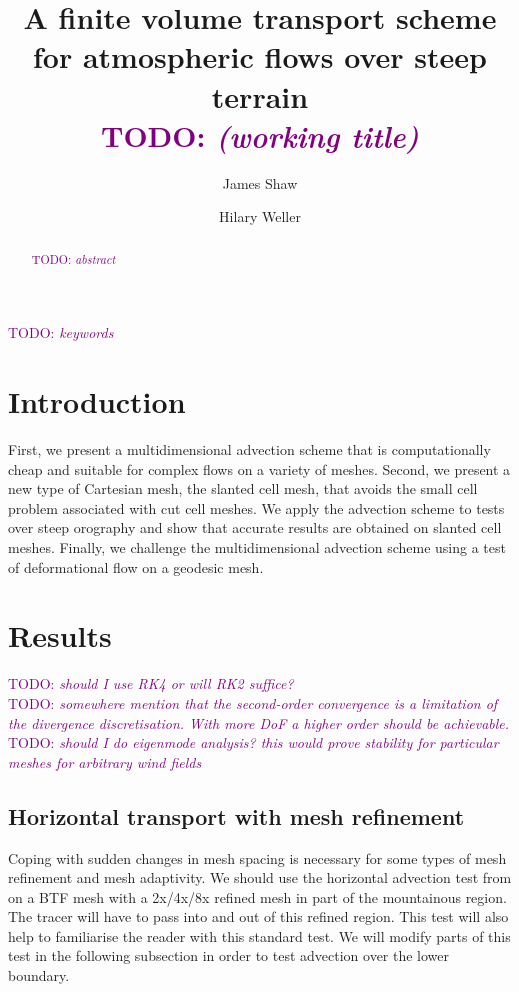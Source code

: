 \documentclass[times]{elsarticle}
\newcommand{\TODO}[1]{\textcolor{purple}{TODO: \emph{#1}}}
\begin{document}
\begin{frontmatter}
\title{A finite volume transport scheme for atmospheric flows over steep terrain \\ \TODO{(working title)}}
\author[uor]{James Shaw}
\author[uor]{Hilary Weller}

\address[uor]{Department of Meteorology, University of Reading, Reading, United Kingdom}

\begin{abstract}
	\TODO{abstract}
\end{abstract}

\begin{keyword}
	\TODO{keywords}
\end{keyword}
\end{frontmatter}

\section{Introduction}

First, we present a multidimensional advection scheme that is computationally cheap and suitable for complex flows on a variety of meshes.  Second, we present a new type of Cartesian mesh, the slanted cell mesh, that avoids the small cell problem associated with cut cell meshes.   We apply the advection scheme to tests over steep orography and show that accurate results are obtained on slanted cell meshes.  Finally, we challenge the multidimensional advection scheme using a test of deformational flow on a geodesic mesh.





\section{Results}
\TODO{should I use RK4 or will RK2 suffice?} \\
\TODO{somewhere mention that the second-order convergence is a limitation of the divergence discretisation.  With more DoF a higher order should be achievable.} \\
\TODO{should I do eigenmode analysis?  this would prove stability for particular meshes for arbitrary wind fields}

\subsection{Horizontal transport with mesh refinement}
Coping with sudden changes in mesh spacing is necessary for some types of mesh refinement and mesh adaptivity.  We should use the horizontal advection test from \citet{schaer2002} on a BTF mesh with a 2x/4x/8x refined mesh in part of the mountainous region.  The tracer will have to pass into and out of this refined region.  This test will also help to familiarise the reader with this standard test.  We will modify parts of this test in the following subsection in order to test advection over the lower boundary.
\end{document}
